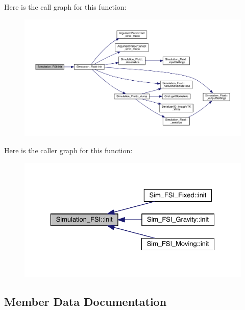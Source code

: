 Here is the call graph for this function\+:
\nopagebreak
\begin{figure}[H]
\begin{center}
\leavevmode
\includegraphics[width=350pt]{d7/dce/class_simulation___f_s_i_a2b00ce68b50616922096fad82f08d46e_cgraph}
\end{center}
\end{figure}




Here is the caller graph for this function\+:\nopagebreak
\begin{figure}[H]
\begin{center}
\leavevmode
\includegraphics[width=329pt]{d7/dce/class_simulation___f_s_i_a2b00ce68b50616922096fad82f08d46e_icgraph}
\end{center}
\end{figure}




\subsection{Member Data Documentation}
\hypertarget{class_simulation___f_s_i_a3546333c7042859fc9b1706604cd744d}{}

